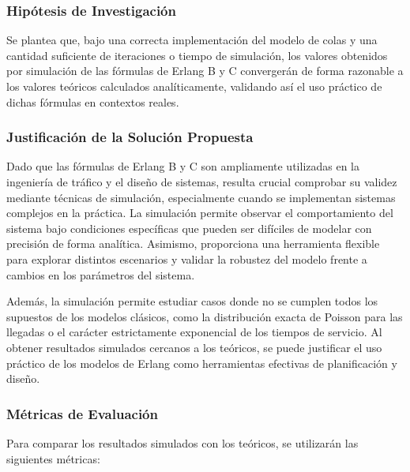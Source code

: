 \documentclass{article}
\begin{document}
\subsubsection{Hipótesis de Investigación}

Se plantea que, bajo una correcta implementación del modelo de colas y una cantidad suficiente de iteraciones o tiempo de simulación, los valores obtenidos por simulación de las fórmulas de Erlang B y C convergerán de forma razonable a los valores teóricos calculados analíticamente, validando así el uso práctico de dichas fórmulas en contextos reales.

\subsubsection{Justificación de la Solución Propuesta}

Dado que las fórmulas de Erlang B y C son ampliamente utilizadas en la ingeniería de tráfico y el diseño de sistemas, resulta crucial comprobar su validez mediante técnicas de simulación, especialmente cuando se implementan sistemas complejos en la práctica. La simulación permite observar el comportamiento del sistema bajo condiciones específicas que pueden ser difíciles de modelar con precisión de forma analítica. Asimismo, proporciona una herramienta flexible para explorar distintos escenarios y validar la robustez del modelo frente a cambios en los parámetros del sistema.

Además, la simulación permite estudiar casos donde no se cumplen todos los supuestos de los modelos clásicos, como la distribución exacta de Poisson para las llegadas o el carácter estrictamente exponencial de los tiempos de servicio. Al obtener resultados simulados cercanos a los teóricos, se puede justificar el uso práctico de los modelos de Erlang como herramientas efectivas de planificación y diseño.

\subsubsection{Métricas de Evaluación}

Para comparar los resultados simulados con los teóricos, se utilizarán las siguientes métricas:
\end{document}
